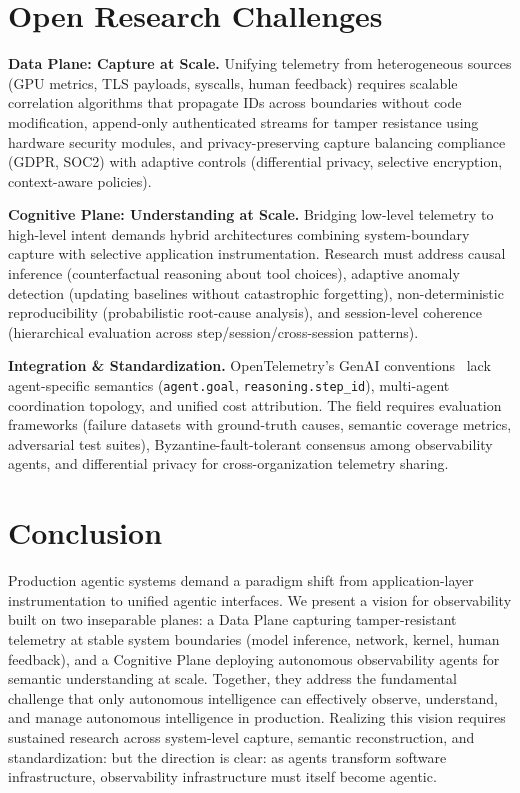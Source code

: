\documentclass[sigplan,screen,9pt]{acmart}
\begin{document}
\section{Open Research Challenges}

\textbf{Data Plane: Capture at Scale.} Unifying telemetry from heterogeneous sources (GPU metrics, TLS payloads, syscalls, human feedback) requires scalable correlation algorithms that propagate IDs across boundaries without code modification, append-only authenticated streams for tamper resistance using hardware security modules, and privacy-preserving capture balancing compliance (GDPR, SOC2) with adaptive controls (differential privacy, selective encryption, context-aware policies).

\textbf{Cognitive Plane: Understanding at Scale.} Bridging low-level telemetry to high-level intent demands hybrid architectures combining system-boundary capture with selective application instrumentation. Research must address causal inference (counterfactual reasoning about tool choices), adaptive anomaly detection (updating baselines without catastrophic forgetting), non-deterministic reproducibility (probabilistic root-cause analysis), and session-level coherence (hierarchical evaluation across step/session/cross-session patterns).

\textbf{Integration \& Standardization.} OpenTelemetry's GenAI conventions~\cite{otelgenai,semconv} lack agent-specific semantics (\texttt{agent.goal}, \texttt{reasoning.step\_id}), multi-agent coordination topology, and unified cost attribution. The field requires evaluation frameworks (failure datasets with ground-truth causes, semantic coverage metrics, adversarial test suites), Byzantine-fault-tolerant consensus among observability agents, and differential privacy for cross-organization telemetry sharing.

\section{Conclusion}

Production agentic systems demand a paradigm shift from application-layer instrumentation to unified agentic interfaces. We present a vision for observability built on two inseparable planes: a Data Plane capturing tamper-resistant telemetry at stable system boundaries (model inference, network, kernel, human feedback), and a Cognitive Plane deploying autonomous observability agents for semantic understanding at scale. Together, they address the fundamental challenge that only autonomous intelligence can effectively observe, understand, and manage autonomous intelligence in production. Realizing this vision requires sustained research across system-level capture, semantic reconstruction, and standardization: but the direction is clear: as agents transform software infrastructure, observability infrastructure must itself become agentic.




\end{document}
